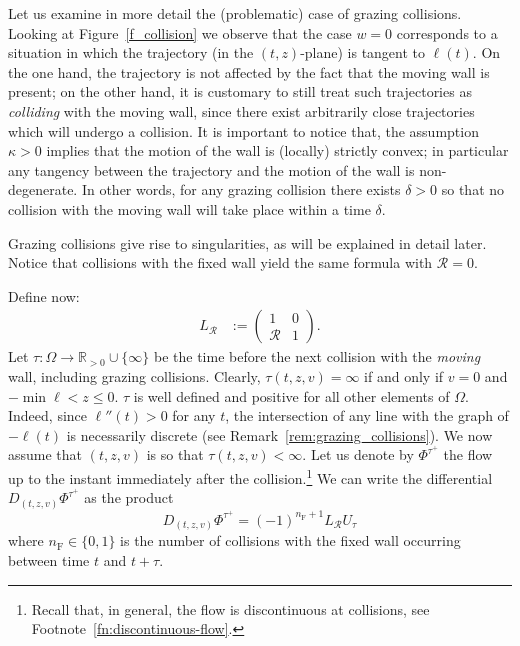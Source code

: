 \documentclass[AHL, Unicode, longabstracts,published]{cedram}
\newcommand{\fft}{\tau}
\newcommand{\curv}{\kappa}
\newcommand{\fixw}{\mathrm{F}}
\newcommand{\bR}{\mathbb{R}}
\newcommand{\cpar}{\mathcal{R}}
\newcommand{\matrixtt}[4]{\left(
\begin{array}{cc}#1&#2\\#3&#4
\end{array}\right)}
\newcommand{\exph}{\Omega}
\newcommand{\flow}[1]{\Phi^{#1}}
\begin{document}
\begin{rema}\label{rem:grazing_collisions}
Let us examine in more detail the (problematic) case of grazing collisions. Looking at Figure~\ref{f_collision} we observe that the case $w = 0$ corresponds to a situation in which the trajectory (in the $(t,z)$-plane) is tangent to $\ell(t)$. On the one hand, the trajectory is not affected by the fact that the moving wall is present; on the other hand, it is customary to still treat such trajectories as \emph{colliding} with the moving wall, since there exist arbitrarily close trajectories which will undergo a collision. It is important to notice that, the assumption $\curv > 0$ implies that the motion of the wall is (locally) strictly convex; in particular any tangency between the trajectory and the motion of the wall is non-degenerate. In other words, for any grazing collision there exists $\delta > 0$ so that no collision with the moving wall will take place within a time $\delta$.
\end{rema}

Grazing collisions give rise to singularities, as will be explained in detail later. Notice that collisions with the fixed wall yield the same formula with $\cpar=0$.

Define now:
\begin{align*}
L_\cpar&:=\matrixtt{1}{0}{\cpar}{1}.
\end{align*}
Let $\fft:\exph\to\bR_{ > 0}\cup\{\infty\}$ be the time before the next collision with the \emph{moving} wall, including grazing collisions. Clearly, $\fft(t,z,v) = \infty$ if and only if $v = 0$ and $-\min \ell< z \le 0$. $\fft$ is well defined and positive for all other elements of $\exph$. Indeed, since $\ell''(t) > 0$ for any $t$, the intersection of any line with the graph of $-\ell(t)$ is necessarily discrete (see Remark~\ref{rem:grazing_collisions}). We now assume that $(t,z,v)$ is so that $\fft(t,z,v) < \infty$. Let us denote by $\flow{\fft^{+}}$ the flow up to the instant immediately after the collision.\footnote{Recall that, in general, the flow is discontinuous at collisions, see Footnote~\ref{fn:discontinuous-flow}.}
We can write the differential $D_{(t,z,v)}\flow{\fft^{+}}$ as the product
\begin{equation}\label{e_Differential}
{D_{(t,z,v)}\flow{\fft^{+}}}= {(-1)}^{n_\fixw+1} L_{\cpar}U_{\fft}
\end{equation}
where $n_{\fixw}\in\{0,1\}$ is the number of collisions with the fixed wall occurring between time $t$ and $t+\fft$.
\end{document}
